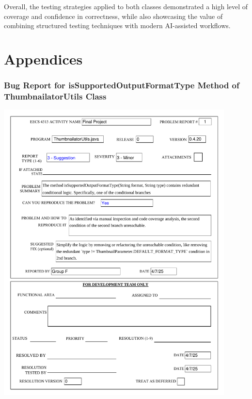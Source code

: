 \documentclass[12pt]{article}
\begin{document}
    Overall, the testing strategies applied to both classes demonstrated a high
        level of coverage and confidence in correctness, while also showcasing
        the value of combining structured testing techniques with modern
        AI-assisted workflows.

    \pagebreak

    \vspace*{5cm}
    \part*{Appendices}
    \thispagestyle{empty}
    \pagebreak

    \begin{appendices}
        \markboth{}{}
        \section{Bug Report for isSupportedOutputFormatType Method of ThumbnailatorUtils Class}
        \label{sec:appendix_a}
        \markboth{}{}
        \begin{center}
            \includegraphics[width=0.9\textwidth]{bug_reports/Bug_Report_1_print.pdf}
        \end{center}


\end{appendices}
\end{document}
